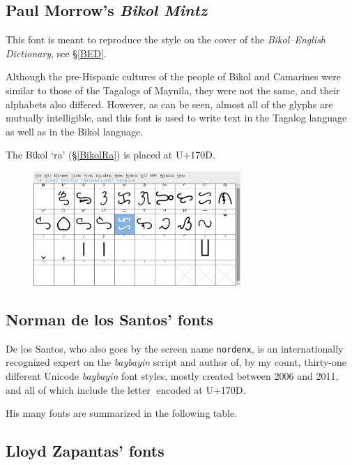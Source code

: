 \documentclass[a4paper,pagesize,openany,14pt,parskip=never]{scrbook}
\newcommand{\≈}{$\approx$}
\newcommand{\ra}{{\baybayin ᜍ}}
\begin{document}
\subsection{Paul Morrow's {\em Bikol Mintz}}

This font is meant to reproduce the style on the cover of the {\em Bikol--English Dictionary}, see \S\ref{BED}.

Although the pre-Hispanic cultures of the people of Bikol and Camarines were similar to those of the Tagalogs of Maynila, they were not the same, and their alphabets also differed. However, as can be seen, almost all of the glyphs are mutually intelligible, and this font is used to write text in the Tagalog language as well as in the Bikol language.

The Bikol `ra' (\S\ref{BikolRa}) is placed at U+170D.

\begin{figure}[H]
\includegraphics[width=0.7\textwidth]{BikolMintz}
\end{figure}

\subsection{Norman de los Santos' fonts}
\label{Nordenx}

De los Santos, who also goes by the screen name \texttt{nordenx}, is an internationally recognized expert on the {\em baybayin} script and author of, by my count, thirty-one different Unicode {\em baybayin} font styles, mostly created between 2006 and 2011, and all of which include the letter \ra encoded at U+170D.

His many fonts are summarized in the following table.



\subsection{Lloyd Zapantas' fonts}
\label{Lloyd}
\end{document}

